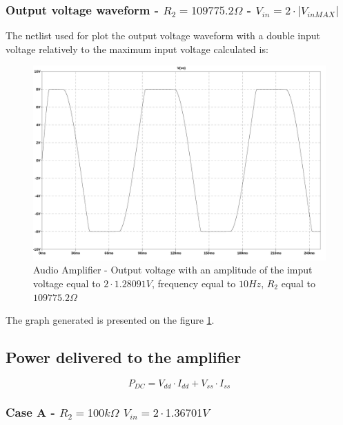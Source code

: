 \documentclass[10pt,a4paper]{article}
\begin{document}
\subsubsection{Output voltage waveform - $R_2 = 109775.2\Omega$ - $V_{in} = 2 \cdot |V_{in MAX} |$}
The netlist used for plot the output voltage waveform with a double input voltage relatively to the maximum input voltage calculated is:\\


\begin{figure}[H]
  \centering
  \includegraphics[width=14cm]{graph/1d5b.jpg}
  \caption{Audio Amplifier - Output voltage with an amplitude of the imput voltage equal to $2 \cdot 1.28091V$, frequency equal to $10Hz$, $R_2$ equal to $109775.2\Omega$}
  \label{1d5bgraph}
\end{figure}

The graph generated is presented on the figure \ref{1d5bgraph}.\\

\subsection{Power delivered to the amplifier}

\begin{equation}
  P_{DC} = V_{dd} \cdot I_{dd} + V_{ss} \cdot I_{ss}
\end{equation}

\subsubsection{Case A - $R_2 = 100k\Omega$ $V_{in} = 2 \cdot 1.36701V$}

\end{document}
